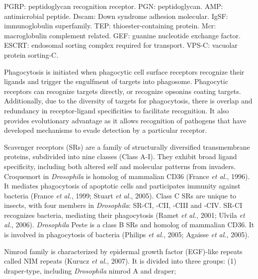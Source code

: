 \documentclass[11pt]{article}
\begin{document}
\begin{sloppypar}
PGRP: peptidoglycan recognition receptor.\newline
PGN: peptidoglycan.\newline
AMP: antimicrobial peptide.\newline
Dscam: Down syndrome adhesion molecular.\newline
IgSF: immunoglobulin superfamily.\newline
TEP: thioester-containing protein.\newline
Mcr: macroglobulin complement related.\newline
GEF: guanine nucleotide exchange factor.\newline
ESCRT: endosomal sorting complex required for transport.\newline 
VPS-C: vacuolar protein sorting-C.
\par
Phagocytosis is initiated when phagocytic cell surface receptors recognize their ligands and trigger the engulfment of targets into phagosome. 
Phagocytic receptors can recognize targets directly, or recognize opsonins coating targets. 
Additionally, due to the diversity of targets for phagocytosis, there is overlap and redundancy in receptor-ligand specificities to facilitate recognition. 
It also provides evolutionary advantage as it allows recognition of pathogens that have developed mechanisms to evade detection by a particular receptor. 
\par
Scavenger receptors (SRs) are a family of structurally diversified transmembrane proteins, subdivided into nine classes (Class A-I). 
They exhibit broad ligand specificity, including both altered self and molecular patterns from invaders. 
Croquemort in \textit{Drosophila} is homolog of mammalian CD36 (France \textit{et al.}, 1996). 
It mediates phagocytosis of apoptotic cells and participates immunity against bacteria (France \textit{et al.}, 1999; Stuart \textit{et al.}, 2005). 
Class C SRs are unique to insects, with four members in \textit{Drosophila}: SR-CI, -CII, -CIII and -CIV. 
SR-CI recognizes bacteria, mediating their phagocytosis (Ramet \textit{et al.}, 2001; Ulvila \textit{et al.}, 2006). 
\textit{Drosophila} Peste is a class B SRs and homolog of mammalian CD36. 
It is involved in phagocytosis of bacteria (Philips \textit{et al.}, 2005; Agaisse \textit{et al.}, 2005).
\par
Nimrod family is characterized by epidermal growth factor (EGF)-like repeats called NIM repeats (Kurucz \textit{et al.}, 2007). 
It is divided into three groups: 
(1) draper-type, including \textit{Drosophila} nimrod A and draper; 

\end{sloppypar}
\end{document}
